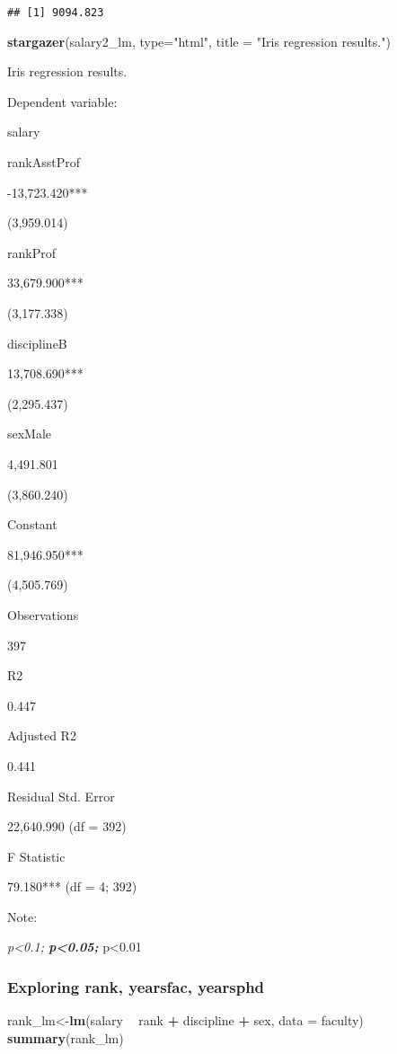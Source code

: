 \documentclass[]{article}
\newenvironment{Shaded}{\begin{snugshade}}{\end{snugshade}}
\newcommand{\KeywordTok}[1]{\textcolor[rgb]{0.13,0.29,0.53}{\textbf{#1}}}
\newcommand{\DataTypeTok}[1]{\textcolor[rgb]{0.13,0.29,0.53}{#1}}
\newcommand{\StringTok}[1]{\textcolor[rgb]{0.31,0.60,0.02}{#1}}
\newcommand{\OperatorTok}[1]{\textcolor[rgb]{0.81,0.36,0.00}{\textbf{#1}}}
\newcommand{\NormalTok}[1]{#1}
\begin{document}
\begin{verbatim}
## [1] 9094.823
\end{verbatim}

\begin{Shaded}
\begin{Highlighting}[]
\KeywordTok{stargazer}\NormalTok{(salary2_lm, }\DataTypeTok{type=}\StringTok{"html"}\NormalTok{,}
          \DataTypeTok{title =} \StringTok{"Iris regression results."}\NormalTok{)}
\end{Highlighting}
\end{Shaded}

Iris regression results.

Dependent variable:

salary

rankAsstProf

-13,723.420***

(3,959.014)

rankProf

33,679.900***

(3,177.338)

disciplineB

13,708.690***

(2,295.437)

sexMale

4,491.801

(3,860.240)

Constant

81,946.950***

(4,505.769)

Observations

397

R2

0.447

Adjusted R2

0.441

Residual Std. Error

22,640.990 (df = 392)

F Statistic

79.180*** (df = 4; 392)

Note:

\emph{p\textless{}0.1; \textbf{p\textless{}0.05; }}p\textless{}0.01

\subsubsection{Exploring rank, yearsfac,
yearsphd}\label{exploring-rank-yearsfac-yearsphd}

\begin{Shaded}
\begin{Highlighting}[]
\NormalTok{rank_lm<-}\KeywordTok{lm}\NormalTok{(salary }\OperatorTok{~}\StringTok{ }\NormalTok{rank }\OperatorTok{+}\StringTok{ }\NormalTok{discipline  }\OperatorTok{+}\StringTok{ }\NormalTok{sex, }\DataTypeTok{data =}\NormalTok{ faculty)}
\KeywordTok{summary}\NormalTok{(rank_lm)}
\end{Highlighting}
\end{Shaded}
\end{document}
